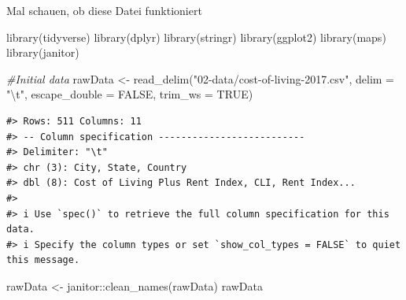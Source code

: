 \documentclass[
  11pt,
  a4paper,
  twoside]{scrbook}
\newenvironment{Shaded}{\begin{snugshade}}{\end{snugshade}}
\newcommand{\AttributeTok}[1]{\textcolor[rgb]{0.77,0.63,0.00}{#1}}
\newcommand{\CommentTok}[1]{\textcolor[rgb]{0.56,0.35,0.01}{\textit{#1}}}
\newcommand{\ConstantTok}[1]{\textcolor[rgb]{0.00,0.00,0.00}{#1}}
\newcommand{\FunctionTok}[1]{\textcolor[rgb]{0.00,0.00,0.00}{#1}}
\newcommand{\NormalTok}[1]{#1}
\newcommand{\OtherTok}[1]{\textcolor[rgb]{0.56,0.35,0.01}{#1}}
\newcommand{\SpecialCharTok}[1]{\textcolor[rgb]{0.00,0.00,0.00}{#1}}
\newcommand{\StringTok}[1]{\textcolor[rgb]{0.31,0.60,0.02}{#1}}
\begin{document}
Mal schauen, ob diese Datei funktioniert

\linespread{1}

\begin{Shaded}
\begin{Highlighting}[]

\FunctionTok{library}\NormalTok{(tidyverse)}
\FunctionTok{library}\NormalTok{(dplyr)}
\FunctionTok{library}\NormalTok{(stringr)}
\FunctionTok{library}\NormalTok{(ggplot2)}
\FunctionTok{library}\NormalTok{(maps)}
\FunctionTok{library}\NormalTok{(janitor)}

\CommentTok{\#Initial data}
\NormalTok{rawData }\OtherTok{\textless{}{-}} \FunctionTok{read\_delim}\NormalTok{(}\StringTok{"02{-}data/cost{-}of{-}living{-}2017.csv"}\NormalTok{, }
                                  \AttributeTok{delim =} \StringTok{"}\SpecialCharTok{\textbackslash{}t}\StringTok{"}\NormalTok{, }\AttributeTok{escape\_double =} \ConstantTok{FALSE}\NormalTok{, }
                                  \AttributeTok{trim\_ws =} \ConstantTok{TRUE}\NormalTok{)}
\end{Highlighting}
\end{Shaded}

\linespread{1}

\begin{verbatim}
#> Rows: 511 Columns: 11
#> -- Column specification --------------------------
#> Delimiter: "\t"
#> chr (3): City, State, Country
#> dbl (8): Cost of Living Plus Rent Index, CLI, Rent Index...
#> 
#> i Use `spec()` to retrieve the full column specification for this data.
#> i Specify the column types or set `show_col_types = FALSE` to quiet this message.
\end{verbatim}

\linespread{1}

\begin{Shaded}
\begin{Highlighting}[]
\NormalTok{rawData }\OtherTok{\textless{}{-}}\NormalTok{ janitor}\SpecialCharTok{::}\FunctionTok{clean\_names}\NormalTok{(rawData)}
\NormalTok{rawData}
\end{Highlighting}
\end{Shaded}

\linespread{1}
\end{document}
